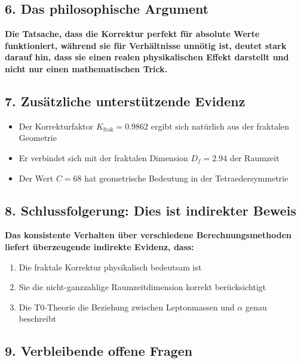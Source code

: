 \documentclass[12pt,a4paper]{article}
\theoremstyle{definition}
\begin{document}
\subsection{6. Das philosophische Argument}

\begin{tcolorbox}[colback=blue!5!white,colframe=blue!75!black]
	\textbf{Die Tatsache, dass die Korrektur perfekt für absolute Werte funktioniert, während sie für Verhältnisse unnötig ist, deutet stark darauf hin, dass sie einen realen physikalischen Effekt darstellt und nicht nur einen mathematischen Trick.}
\end{tcolorbox}

\subsection{7. Zusätzliche unterstützende Evidenz}

\begin{itemize}
	\item Der Korrekturfaktor $K_{\text{frak}} = 0.9862$ ergibt sich natürlich aus der fraktalen Geometrie
	\item Er verbindet sich mit der fraktalen Dimension $D_f = 2.94$ der Raumzeit
	\item Der Wert $C = 68$ hat geometrische Bedeutung in der Tetraedersymmetrie
\end{itemize}

\subsection{8. Schlussfolgerung: Dies ist indirekter Beweis}

\begin{tcolorbox}[colback=red!5!white,colframe=red!75!black]
	\textbf{Das konsistente Verhalten über verschiedene Berechnungsmethoden liefert überzeugende indirekte Evidenz, dass:}
	\begin{enumerate}
		\item Die fraktale Korrektur physikalisch bedeutsam ist
		\item Sie die nicht-ganzzahlige Raumzeitdimension korrekt berücksichtigt
		\item Die T0-Theorie die Beziehung zwischen Leptonmassen und $\alpha$ genau beschreibt
	\end{enumerate}
\end{tcolorbox}

\subsection{9. Verbleibende offene Fragen}
\end{document}
